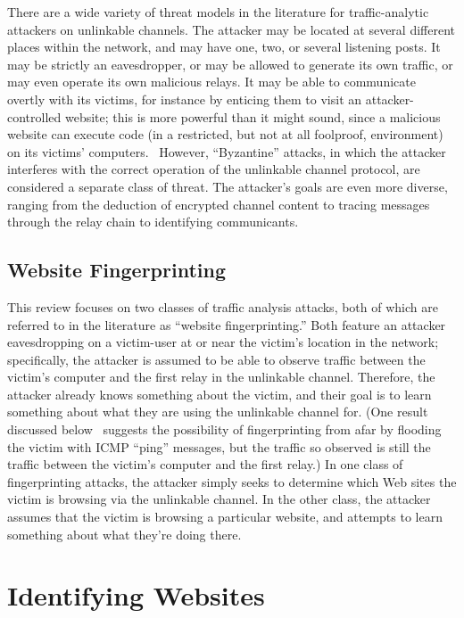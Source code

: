 \documentclass{zarticle}
\begin{document}
There are a wide variety of threat models in the literature for
traffic-analytic attackers on unlinkable channels.  The attacker may
be located at several different places within the network, and may
have one, two, or several listening posts.  It may be strictly an
eavesdropper, or may be allowed to generate its own traffic, or may
even operate its own malicious relays.  It may be able to communicate
overtly with its victims, for instance by enticing them to visit an
attacker-controlled website; this is more powerful than it might
sound, since a malicious website can execute code (in a restricted,
but not at all foolproof, environment) on its victims'
computers.~\cite{barth2008securing} However, “Byzantine” attacks, in
which the attacker interferes with the correct operation of the
unlinkable channel protocol, are considered a separate class of
threat.  The attacker's goals are even more diverse, ranging from
the deduction of encrypted channel content to tracing messages through
the relay chain to identifying communicants.

\subsection{Website Fingerprinting}

This review focuses on two classes of traffic analysis attacks, both
of which are referred to in the literature as “website
fingerprinting.”  Both feature an attacker eavesdropping on a
victim-user at or near the victim's location in the network;
specifically, the attacker is assumed to be able to observe traffic
between the victim's computer and the first relay in the unlinkable
channel.  Therefore, the attacker already knows something about the
victim, and their goal is to learn something about what they are using
the unlinkable channel for.  (One result discussed
below~\cite{gong2011fingerprinting} suggests the possibility of
fingerprinting from afar by flooding the victim with ICMP “ping”
messages, but the traffic so observed is still the traffic between the
victim's computer and the first relay.)  In one class of
fingerprinting attacks, the attacker simply seeks to determine which
Web sites the victim is browsing via the unlinkable channel.  In the
other class, the attacker assumes that the victim is browsing a
particular website, and attempts to learn something about what they're
doing there.

\section{Identifying Websites}
\end{document}
